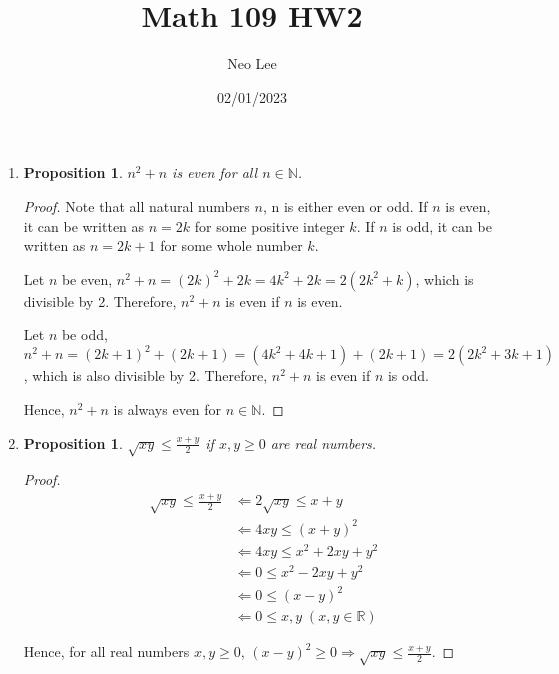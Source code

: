 \documentclass{article}
\title{Math 109 HW2}
\author{Neo Lee}
\date{02/01/2023}
\newtheorem{prop}[thm]{Proposition}
\begin{document}
 

\maketitle 

\begin{enumerate}[label={(\arabic*)}]
\item 
\begin{prop}
    $n^2 + n$ is even for all $n \in \mathbb{N}$.
\end{prop}
\begin{proof}
    Note that all natural numbers $n$, n is either even or odd.
    If $n$ is even, it can be written as $n = 2k$ for some positive integer $k$.
    If $n$ is odd, it can be written as $n = 2k + 1$ for some whole number $k$.

    Let $n$ be even, $n^2 + n = (2k)^2 + 2k = 4k^2 + 2k = 2(2k^2 + k)$, which is divisible by 2.
    Therefore, $n^2 + n$ is even if $n$ is even.

    Let $n$ be odd, $n^2 + n = (2k + 1)^2 + (2k + 1) = (4k^2 + 4k + 1) + (2k + 1) = 2(2k^2 + 3k + 1)$, which is also divisible by 2.
    Therefore, $n^2 + n$ is even if $n$ is odd.

    Hence, $n^2 + n$ is always even for $n \in \mathbb{N}$.
\end{proof}

\item 
\begin{prop}
    $\sqrt{xy} \le \frac{x + y}{2}$ if $x, y \ge 0$ are real numbers.
\end{prop}
\begin{proof}
    \begin{align}
        \sqrt{xy} \le \frac{x + y}{2} & \Leftarrow 2\sqrt{xy} \le x + y \\
        & \Leftarrow 4xy \le (x + y)^2 \\
        & \Leftarrow 4xy \le x^2 + 2xy + y^2 \\
        & \Leftarrow 0 \le x^2 - 2xy + y^2 \\ 
        & \Leftarrow 0 \le (x - y)^2 \\ 
        & \Leftarrow 0 \le x, y \; (x, y \in \mathbb{R})
    \end{align}
    
    Hence, for all real numbers $x, y \ge 0$, $(x - y)^2 \ge 0 \Rightarrow \sqrt{xy} \le \frac{x + y}{2}$.
\end{proof}


\end{enumerate}
\end{document}
